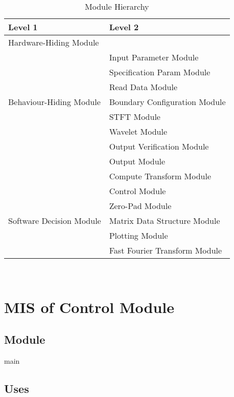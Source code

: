 \documentclass[12pt, titlepage]{article}
\begin{document}
\begin{table}[h!]
\centering
\begin{tabular}{p{} p{}}
\toprule
\textbf{Level 1} & \textbf{Level 2}\\
\midrule

{Hardware-Hiding Module} & ~ \\
\midrule

\multirow{7}{0.3\textwidth}{Behaviour-Hiding Module} &  Input Parameter Module\\
& Specification Param Module \\
& Read Data Module\\
& Boundary Configuration Module \\
& STFT Module\\
& Wavelet Module\\
& Output Verification Module\\
& Output Module\\
& Compute Transform Module \\ 
& Control Module\\
\midrule

\multirow{3}{0.3\textwidth}{Software Decision Module} & { Zero-Pad Module}\\
& Matrix Data Structure Module\\ 
& Plotting Module\\
& Fast Fourier Transform Module\\
\bottomrule

\end{tabular}
\caption{Module Hierarchy}
\label{TblMH}
\end{table}

\newpage
~\newpage

\section{MIS of Control Module} \label{ControlModule} 



\subsection{Module}

main

\subsection{Uses}
\end{document}
